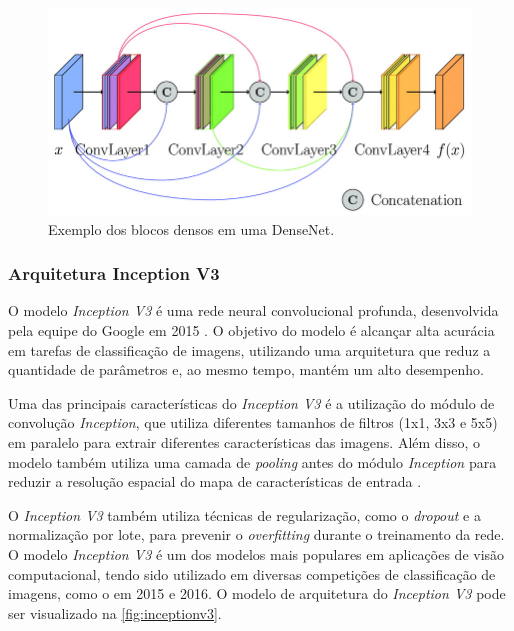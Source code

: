 \begin{figure}[htb]
    \centering
    \includegraphics[width=0.8\linewidth]{images/densenet.jpg}
    \caption{Exemplo dos blocos densos em uma DenseNet.}
    \label{fig:densenet}
\end{figure}



\subsubsection{Arquitetura Inception V3}

O modelo \textit{Inception V3}  é uma rede neural convolucional profunda, desenvolvida pela equipe do Google em 2015 \cite{szegedy2015going}. 
O objetivo do modelo é alcançar alta acurácia em tarefas de classificação de imagens, utilizando uma arquitetura que reduz a quantidade de parâmetros e, ao mesmo tempo, mantém um alto desempenho.

Uma das principais características do \textit{Inception V3} é a utilização do módulo de convolução \textit{Inception}, que utiliza diferentes tamanhos de filtros (1x1, 3x3 e 5x5) em paralelo para extrair diferentes características das imagens. 
Além disso, o modelo também utiliza uma camada de \textit{pooling} antes do módulo \textit{Inception} para reduzir a resolução espacial do mapa de características de entrada \cite{szegedy2015going}.

O \textit{Inception V3} também utiliza técnicas de regularização, como o \textit{dropout} e a normalização por lote, para prevenir o \textit{overfitting} durante o treinamento da rede.
O modelo \textit{Inception V3} é um dos modelos mais populares em aplicações de visão computacional, tendo sido utilizado em diversas competições de classificação de imagens, como o  em 2015 e 2016.
O modelo de arquitetura do \textit{Inception V3} pode ser visualizado na  \autoref{fig:inceptionv3}.


